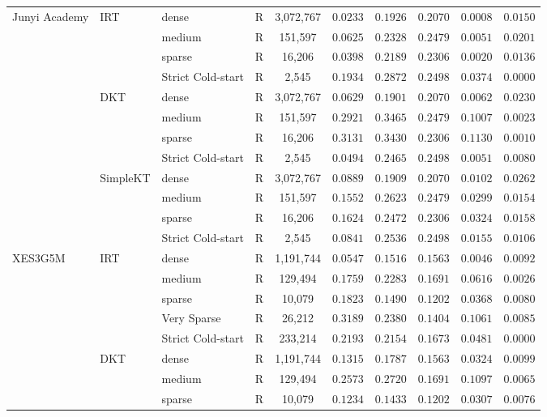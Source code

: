 \begin{table}[htbp]
{\begin{tabular}{lllrcccccc}
\midrule
Junyi Academy & IRT & dense & R & 3,072,767 & $0.0233$ & $0.1926$ & $0.2070$ & $0.0008$ & $0.0150$ \\
 &  & medium & R & 151,597 & $0.0625$ & $0.2328$ & $0.2479$ & $0.0051$ & $0.0201$ \\
 &  & sparse & R & 16,206 & $0.0398$ & $0.2189$ & $0.2306$ & $0.0020$ & $0.0136$ \\
 &  & Strict Cold-start & R & 2,545 & $0.1934$ & $0.2872$ & $0.2498$ & $0.0374$ & $0.0000$ \\
 & DKT & dense & R & 3,072,767 & $0.0629$ & $0.1901$ & $0.2070$ & $0.0062$ & $0.0230$ \\
 &  & medium & R & 151,597 & $0.2921$ & $0.3465$ & $0.2479$ & $0.1007$ & $0.0023$ \\
 &  & sparse & R & 16,206 & $0.3131$ & $0.3430$ & $0.2306$ & $0.1130$ & $0.0010$ \\
 &  & Strict Cold-start & R & 2,545 & $0.0494$ & $0.2465$ & $0.2498$ & $0.0051$ & $0.0080$ \\
 & SimpleKT & dense & R & 3,072,767 & $0.0889$ & $0.1909$ & $0.2070$ & $0.0102$ & $0.0262$ \\
 &  & medium & R & 151,597 & $0.1552$ & $0.2623$ & $0.2479$ & $0.0299$ & $0.0154$ \\
 &  & sparse & R & 16,206 & $0.1624$ & $0.2472$ & $0.2306$ & $0.0324$ & $0.0158$ \\
 &  & Strict Cold-start & R & 2,545 & $0.0841$ & $0.2536$ & $0.2498$ & $0.0155$ & $0.0106$ \\
\midrule
XES3G5M & IRT & dense & R & 1,191,744 & $0.0547$ & $0.1516$ & $0.1563$ & $0.0046$ & $0.0092$ \\
 &  & medium & R & 129,494 & $0.1759$ & $0.2283$ & $0.1691$ & $0.0616$ & $0.0026$ \\
 &  & sparse & R & 10,079 & $0.1823$ & $0.1490$ & $0.1202$ & $0.0368$ & $0.0080$ \\
 &  & Very Sparse & R & 26,212 & $0.3189$ & $0.2380$ & $0.1404$ & $0.1061$ & $0.0085$ \\
 &  & Strict Cold-start & R & 233,214 & $0.2193$ & $0.2154$ & $0.1673$ & $0.0481$ & $0.0000$ \\
 & DKT & dense & R & 1,191,744 & $0.1315$ & $0.1787$ & $0.1563$ & $0.0324$ & $0.0099$ \\
 &  & medium & R & 129,494 & $0.2573$ & $0.2720$ & $0.1691$ & $0.1097$ & $0.0065$ \\
 &  & sparse & R & 10,079 & $0.1234$ & $0.1433$ & $0.1202$ & $0.0307$ & $0.0076$ \\

\end{tabular}}
\end{table}
